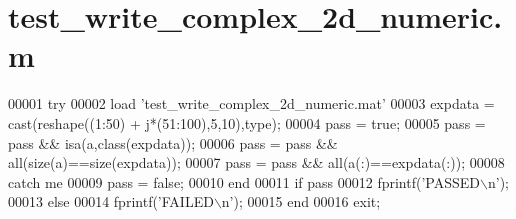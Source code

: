 \hypertarget{test__write__complex__2d__numeric_8m_source}{}\section{test\+\_\+write\+\_\+complex\+\_\+2d\+\_\+numeric.\+m}
\label{test__write__complex__2d__numeric_8m_source}

\begin{DoxyCode}
00001 \textcolor{keywordflow}{try}
00002     load \textcolor{stringliteral}{'test\_write\_complex\_2d\_numeric.mat'}
00003     expdata = cast(reshape((1:50) + j*(51:100),5,10),type);
00004     pass = \textcolor{keyword}{true};
00005     pass = pass && isa(a,\textcolor{keyword}{class}(expdata));
00006     pass = pass && all(size(a)==size(expdata));
00007     pass = pass && all(a(:)==expdata(:));
00008 \textcolor{keywordflow}{catch} me
00009     pass = \textcolor{keyword}{false};
00010 end
00011 \textcolor{keywordflow}{if} pass
00012     fprintf(\textcolor{stringliteral}{'PASSED\(\backslash\)n'});
00013 \textcolor{keywordflow}{else}
00014     fprintf(\textcolor{stringliteral}{'FAILED\(\backslash\)n'});
00015 end
00016 exit;
\end{DoxyCode}
